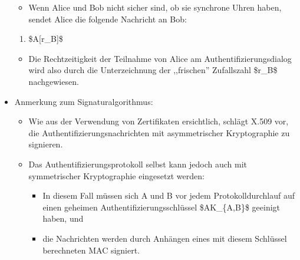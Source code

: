 \documentclass[a4paper]{article}
\begin{document}
\begin{multicols}{3}
\begin{itemize}
              \begin{itemize}
                  \item
                        Wenn Alice und Bob nicht sicher sind, ob sie synchrone Uhren haben,
                        sendet Alice die folgende Nachricht an Bob:
              \end{itemize}

              \begin{enumerate}
                  \def\labelenumi{\arabic{enumi}.}
                  \setcounter{enumi}{2}
                  \item
                        \$A{[}r\_B{]}\$
              \end{enumerate}

              \begin{itemize}
                  \item
                        Die Rechtzeitigkeit der Teilnahme von Alice am
                        Authentifizierungsdialog wird also durch die Unterzeichnung der
                        ,,frischen'' Zufallszahl \$r\_B\$ nachgewiesen.
              \end{itemize}
        \item
              Anmerkung zum Signaturalgorithmus:

              \begin{itemize}
                  \item
                        Wie aus der Verwendung von Zertifikaten ersichtlich, schlägt X.509
                        vor, die Authentifizierungsnachrichten mit asymmetrischer
                        Kryptographie zu signieren.
                  \item
                        Das Authentifizierungsprotokoll selbst kann jedoch auch mit
                        symmetrischer Kryptographie eingesetzt werden:

                        \begin{itemize}
                            \item
                                  In diesem Fall müssen sich A und B vor jedem Protokolldurchlauf
                                  auf einen geheimen Authentifizierungsschlüssel \$AK\_\{A,B\}\$
                                  geeinigt haben, und
                            \item
                                  die Nachrichten werden durch Anhängen eines mit diesem Schlüssel
                                  berechneten MAC signiert.
                        \end{itemize}
              \end{itemize}
    \end{itemize}



\end{multicols}
\end{document}
